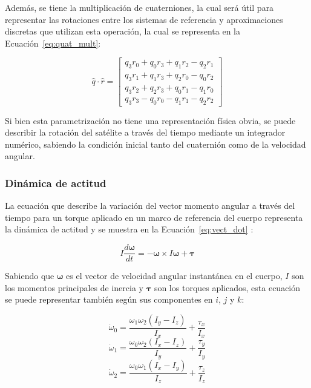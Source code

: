 Además, se tiene la multiplicación de cuaterniones, la cual será útil para representar las rotaciones entre los sistemas de referencia y aproximaciones discretas que utilizan esta operación, la cual se representa en la Ecuación~\ref{eq:quat_mult}:

\begin{equation}
	\hat{q} \cdot \hat{r} =
	\begin{bmatrix}
		q_3 r_0 + q_0 r_3 + q_1 r_2 - q_2 r_1 \\
		q_3 r_1 + q_1 r_3 + q_2 r_0 - q_0 r_2 \\
		q_3 r_2 + q_2 r_3 + q_0 r_1 - q_1 r_0 \\
		q_3 r_3 - q_0 r_0 - q_1 r_1 - q_2 r_2
	\end{bmatrix}
	\label{eq:quat_mult}
\end{equation}

Si bien esta parametrización no tiene una representación física obvia, se puede describir la rotación del satélite a través del tiempo mediante un integrador numérico, sabiendo la condición inicial tanto del cuaternión como de la velocidad angular.

\subsubsection{Dinámica de actitud}

La ecuación que describe la variación del vector momento angular a través del tiempo para un torque aplicado en un marco de referencia del cuerpo representa la dinámica de actitud y se muestra en la Ecuación~\ref{eq:vect_dot} \cite{ref22}:

\begin{equation}
	I \frac{d\boldsymbol{\omega}}{dt} = - \boldsymbol{\omega} \times I \boldsymbol{\omega} + \boldsymbol{\tau}
	\label{eq:vect_dot}
\end{equation}

Sabiendo que \( \boldsymbol{\omega} \) es el vector de velocidad angular instantánea en el cuerpo, \( I \) son los momentos principales de inercia y \( \boldsymbol{\tau} \) son los torques aplicados, esta ecuación se puede representar también según sus componentes en \( i \), \( j \) y \( k \):

\[
\dot{\omega}_0 = \frac{\omega_1 \omega_2 (I_y - I_z)}{I_x} + \frac{\tau_x}{I_x}
\]
\[
\dot{\omega}_1 = \frac{\omega_0 \omega_2 (I_x - I_z)}{I_y} + \frac{\tau_y}{I_y}
\]
\[
\dot{\omega}_2 = \frac{\omega_0 \omega_1 (I_x - I_y)}{I_z} + \frac{\tau_z}{I_z}
\]

